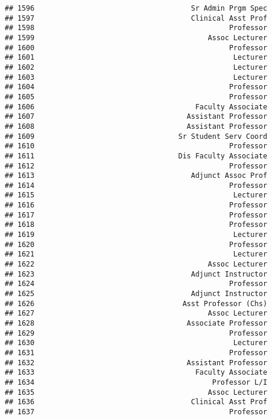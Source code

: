 \documentclass[
]{article}
\begin{document}
\begin{verbatim}
## 1596                                     Sr Admin Prgm Spec
## 1597                                     Clinical Asst Prof
## 1598                                              Professor
## 1599                                         Assoc Lecturer
## 1600                                              Professor
## 1601                                               Lecturer
## 1602                                               Lecturer
## 1603                                               Lecturer
## 1604                                              Professor
## 1605                                              Professor
## 1606                                      Faculty Associate
## 1607                                    Assistant Professor
## 1608                                    Assistant Professor
## 1609                                  Sr Student Serv Coord
## 1610                                              Professor
## 1611                                  Dis Faculty Associate
## 1612                                              Professor
## 1613                                     Adjunct Assoc Prof
## 1614                                              Professor
## 1615                                               Lecturer
## 1616                                              Professor
## 1617                                              Professor
## 1618                                              Professor
## 1619                                               Lecturer
## 1620                                              Professor
## 1621                                               Lecturer
## 1622                                         Assoc Lecturer
## 1623                                     Adjunct Instructor
## 1624                                              Professor
## 1625                                     Adjunct Instructor
## 1626                                   Asst Professor (Chs)
## 1627                                         Assoc Lecturer
## 1628                                    Associate Professor
## 1629                                              Professor
## 1630                                               Lecturer
## 1631                                              Professor
## 1632                                    Assistant Professor
## 1633                                      Faculty Associate
## 1634                                          Professor L/I
## 1635                                         Assoc Lecturer
## 1636                                     Clinical Asst Prof
## 1637                                              Professor

\end{verbatim}
\end{document}
